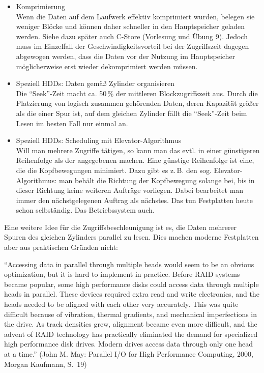 \begin{solution}
\begin{itemize}
		\item Komprimierung\\
		Wenn die Daten auf dem Laufwerk effektiv komprimiert wurden, belegen sie weniger Blöcke und können daher schneller in den Hauptspeicher geladen werden. Siehe dazu später auch C-Store (Vorlesung und Übung 9). Jedoch muss im Einzelfall der Geschwindigkeitsvorteil bei der Zugriffszeit dagegen abgewogen werden, dass die Daten vor der Nutzung im Hauptspeicher möglicherweise erst wieder dekomprimiert werden müssen.

		\item Speziell HDDs: Daten gemäß Zylinder organisieren\\
		Die "`Seek"'-Zeit macht ca. 50\,\% der mittleren Blockzugriffszeit aus. Durch die Platzierung von logisch zusammen gehörenden Daten, deren Kapazität größer als die einer Spur ist, auf dem gleichen Zylinder fällt die "`Seek"'-Zeit beim Lesen im besten Fall nur einmal an.

		\item Speziell HDDs: Scheduling mit Elevator-Algorithmus\\
		Will man mehrere Zugriffe tätigen, so kann man das evtl. in einer günstigeren Reihenfolge als der angegebenen machen. Eine günstige Reihenfolge ist eine, die die Kopfbewegungen minimiert. Dazu gibt es z.\,B. den sog. Elevator-Algorithmus: man behält die Richtung der Kopfbewegung solange bei, bis in dieser Richtung keine weiteren Aufträge vorliegen. Dabei bearbeitet man immer den nächstgelegenen Auftrag als nächstes. Das tun Festplatten heute schon selbständig. Das Betriebssystem auch.
	\end{itemize}
\end{solution}

\begin{note}
	Eine weitere Idee für die Zugriffsbeschleunigung ist es, die Daten mehrerer Spuren des gleichen Zylinders parallel zu lesen.
	Dies machen moderne Festplatten aber aus praktischen Gründen nicht:
	
	"`Accessing data in parallel through multiple heads would seem to be an obvious optimization, but it is hard to implement in practice. Before RAID systems became popular, some high performance disks could access data through multiple heads in parallel. These devices required extra read and write electronics, and the heads needed to be aligned with each other very accurately. This was quite difficult because of vibration, thermal gradients, and mechanical imperfections in the drive. As track densities grew, alignment became even more difficult, and the advent of RAID technology has practically eliminated the demand for specialized high performance disk drives. Modern drives access data through only one head at a time."' (John M. May: Parallel I/O for High Performance Computing, 2000, Morgan Kaufmann, S.~19)
\end{note}
